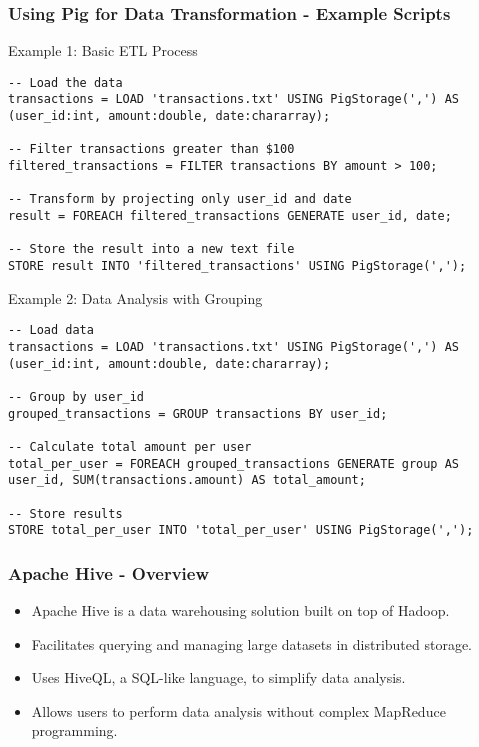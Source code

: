 \documentclass[aspectratio=169]{beamer}
\begin{document}
\begin{frame}[fragile]
    \frametitle{Using Pig for Data Transformation - Example Scripts}
    \begin{block}{Example 1: Basic ETL Process}
        \begin{lstlisting}[language=Pig]
-- Load the data
transactions = LOAD 'transactions.txt' USING PigStorage(',') AS (user_id:int, amount:double, date:chararray);

-- Filter transactions greater than $100
filtered_transactions = FILTER transactions BY amount > 100;

-- Transform by projecting only user_id and date
result = FOREACH filtered_transactions GENERATE user_id, date;

-- Store the result into a new text file
STORE result INTO 'filtered_transactions' USING PigStorage(',');
        \end{lstlisting}
    \end{block}

    \begin{block}{Example 2: Data Analysis with Grouping}
        \begin{lstlisting}[language=Pig]
-- Load data
transactions = LOAD 'transactions.txt' USING PigStorage(',') AS (user_id:int, amount:double, date:chararray);

-- Group by user_id
grouped_transactions = GROUP transactions BY user_id;

-- Calculate total amount per user
total_per_user = FOREACH grouped_transactions GENERATE group AS user_id, SUM(transactions.amount) AS total_amount;

-- Store results
STORE total_per_user INTO 'total_per_user' USING PigStorage(',');
        \end{lstlisting}
    \end{block}
\end{frame}

\begin{frame}[fragile]
    \frametitle{Apache Hive - Overview}
    \begin{itemize}
        \item Apache Hive is a data warehousing solution built on top of Hadoop.
        \item Facilitates querying and managing large datasets in distributed storage.
        \item Uses HiveQL, a SQL-like language, to simplify data analysis.
        \item Allows users to perform data analysis without complex MapReduce programming.
    \end{itemize}
\end{frame}
\end{document}
